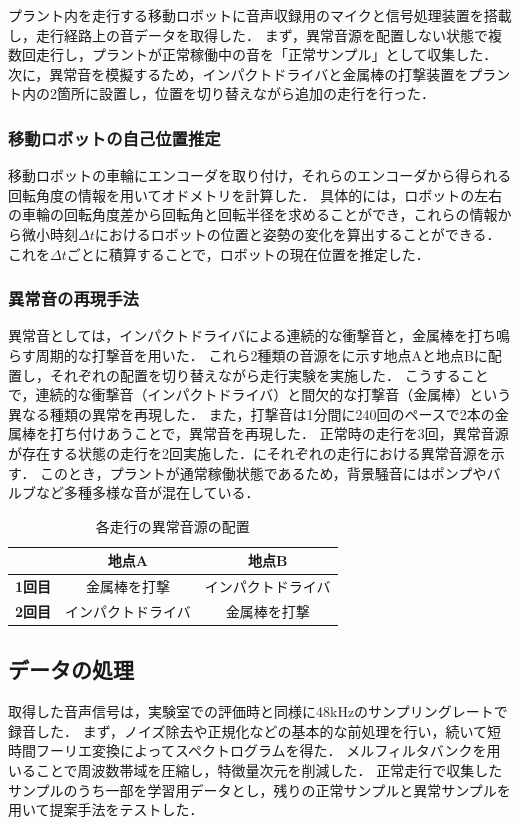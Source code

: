 \documentclass[../main]{subfiles}
\begin{document}
プラント内を走行する移動ロボットに音声収録用のマイクと信号処理装置を搭載し，走行経路上の音データを取得した．
まず，異常音源を配置しない状態で複数回走行し，プラントが正常稼働中の音を「正常サンプル」として収集した．
次に，異常音を模擬するため，インパクトドライバと金属棒の打撃装置をプラント内の2箇所に設置し，位置を切り替えながら追加の走行を行った．

\subsubsection{移動ロボットの自己位置推定}
移動ロボットの車輪にエンコーダを取り付け，それらのエンコーダから得られる回転角度の情報を用いてオドメトリを計算した．
具体的には，ロボットの左右の車輪の回転角度差から回転角と回転半径を求めることができ，これらの情報から微小時刻$\Delta t$におけるロボットの位置と姿勢の変化を算出することができる．
これを$\Delta t$ごとに積算することで，ロボットの現在位置を推定した．

\subsubsection{異常音の再現手法}
異常音としては，インパクトドライバによる連続的な衝撃音と，金属棒を打ち鳴らす周期的な打撃音を用いた．
これら2種類の音源をに示す地点Aと地点Bに配置し，それぞれの配置を切り替えながら走行実験を実施した．
こうすることで，連続的な衝撃音（インパクトドライバ）と間欠的な打撃音（金属棒）という異なる種類の異常を再現した．
また，打撃音は1分間に240回のペースで2本の金属棒を打ち付けあうことで，異常音を再現した．
正常時の走行を3回，異常音源が存在する状態の走行を2回実施した．にそれぞれの走行における異常音源を示す．
このとき，プラントが通常稼働状態であるため，背景騒音にはポンプやバルブなど多種多様な音が混在している．


\begin{table}[htbp]
  \centering
  \caption{各走行の異常音源の配置}
  \label{tab:abnormal_sound_jp}
  \begin{tabular}{c|c|c}
  \hline
   & \textbf{地点A} & \textbf{地点B} \\ \hline
  \textbf{1回目} & 金属棒を打撃 & インパクトドライバ \\
  \textbf{2回目} & インパクトドライバ & 金属棒を打撃 \\ \hline
  \end{tabular}
\end{table}

\subsection{データの処理}
\label{subsec:vexp_ci_processing}
取得した音声信号は，実験室での評価時と同様に48kHzのサンプリングレートで録音した．
まず，ノイズ除去や正規化などの基本的な前処理を行い，続いて短時間フーリエ変換によってスペクトログラムを得た．
メルフィルタバンクを用いることで周波数帯域を圧縮し，特徴量次元を削減した．
正常走行で収集したサンプルのうち一部を学習用データとし，残りの正常サンプルと異常サンプルを用いて提案手法をテストした．
\end{document}
